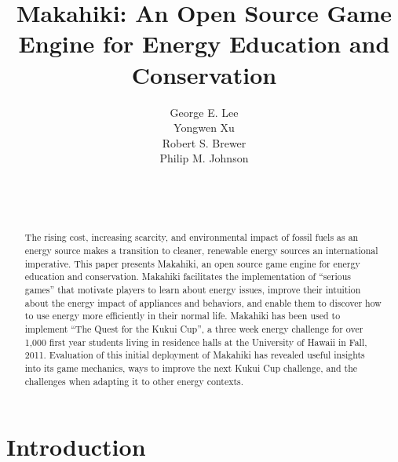 \documentclass{acm_proc_article-sp}
\begin{document}
\title{Makahiki: An Open Source Game Engine for Energy Education and Conservation}


\author{
\smallskip
George E. Lee\\ 
\smallskip
Yongwen Xu\\ 
\smallskip
Robert S. Brewer\\ 
\smallskip
Philip M. Johnson\\
       \\
       \\
       \\
}

\maketitle
\begin{abstract}
  The rising cost, increasing scarcity, and environmental impact of fossil
  fuels as an energy source makes a transition to cleaner, renewable energy
  sources an international imperative.  This paper presents Makahiki, an
  open source game engine for energy education and conservation.  Makahiki
  facilitates the implementation of ``serious games'' that motivate players
  to learn about energy issues, improve their intuition about the energy
  impact of appliances and behaviors, and enable them to discover how to
  use energy more efficiently in their normal life.  Makahiki has been
  used to implement ``The Quest for the Kukui Cup'', a three week energy
  challenge for over 1,000 first year students living in residence halls at
  the University of Hawaii in Fall, 2011.   Evaluation of this initial
  deployment of Makahiki has revealed useful insights into its game
  mechanics, ways to improve the next Kukui Cup challenge, and the
  challenges when adapting it to other energy contexts.
\end{abstract}




\section{Introduction}
\end{document}
